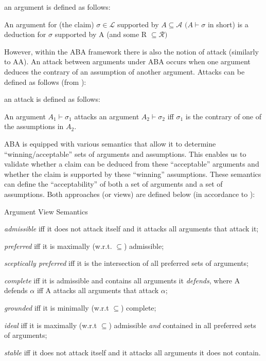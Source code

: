 \begin{defn} an argument is defined as follows:

An argument for (the claim) $\sigma \in \mathcal{L}$ supported by $A \subseteq \mathcal{A}$ $(A \vdash \sigma$ in short) is a deduction for $\sigma$ supported by A (and some R $\subseteq \mathcal{R})$
\newline
\end{defn}


However, within the ABA framework there is also the notion of attack (similarly to AA). An attack between arguments under ABA occurs when one argument deduces the contrary of an assumption of another argument. 
Attacks can be defined as follows (from \cite{abatut}):
\newline

\begin{defn} an attack is defined as follows:

An argument $A_1 \vdash \sigma_1$ attacks an argument $A_2 \vdash \sigma_2$ iff $\sigma_1$ is the contrary of one of the assumptions in $A_2$.
\newline
\end{defn}

ABA is equipped with various semantics that allow it to determine ``winning/acceptable'' sets of arguments and assumptions. This enables us to validate whether a claim can be deduced from these ``acceptable'' arguments and whether the claim is supported by these ``winning'' assumptions. These semantics can define the ``acceptability'' of both a set of arguments and a set of assumptions. Both approaches (or views) are defined below (in accordance to \cite{abatut}):
\newline

Argument View Semantics
\begin{itemize*}
\item \emph{admissible} iff it does not attack itself and it attacks all arguments that attack it;
\item \emph{preferred} iff it is maximally (w.r.t. $\subseteq$) admissible;
\item \emph{sceptically preferred} iff it is the intersection of all preferred sets of arguments;
\item \emph{complete} iff it is admissible and contains all arguments it \emph{defends}, where A defends $\alpha$ iff A attacks all arguments that attack $\alpha$;
\item \emph{grounded} iff it is minimally (w.r.t $\subseteq$) complete;
\item \emph{ideal} iff it is maximally (w.r.t $\subseteq$) admissible \emph{and} contained in all preferred sets of arguments;
\item \emph{stable} iff it does not attack itself and it attacks all arguments it does not contain.
\end{itemize*}

